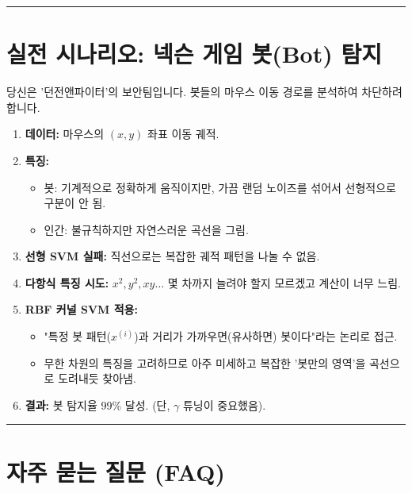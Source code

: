 \documentclass[11pt,a4paper]{book}
\theoremstyle{definition}
\begin{document}
\vspace{0.5cm}\hrule\vspace{0.5cm}

\section{실전 시나리오: 넥슨 게임 봇(Bot) 탐지}

\begin{storybox}[title={Scenario: 인간과 봇의 움직임 구분}]
당신은 '던전앤파이터'의 보안팀입니다. 봇들의 마우스 이동 경로를 분석하여 차단하려 합니다.
\end{storybox}

\begin{enumerate}
    \item \textbf{데이터:} 마우스의 $(x, y)$ 좌표 이동 궤적.
    \item \textbf{특징:}
    \begin{itemize}
        \item 봇: 기계적으로 정확하게 움직이지만, 가끔 랜덤 노이즈를 섞어서 선형적으로 구분이 안 됨.
        \item 인간: 불규칙하지만 자연스러운 곡선을 그림.
    \end{itemize}
    \item \textbf{선형 SVM 실패:} 직선으로는 복잡한 궤적 패턴을 나눌 수 없음.
    \item \textbf{다항식 특징 시도:} $x^2, y^2, xy \dots$ 몇 차까지 늘려야 할지 모르겠고 계산이 너무 느림.
    \item \textbf{RBF 커널 SVM 적용:}
    \begin{itemize}
        \item "특정 봇 패턴($x^{(i)}$)과 거리가 가까우면(유사하면) 봇이다"라는 논리로 접근.
        \item 무한 차원의 특징을 고려하므로 아주 미세하고 복잡한 '봇만의 영역'을 곡선으로 도려내듯 찾아냄.
    \end{itemize}
    \item \textbf{결과:} 봇 탐지율 99\% 달성. (단, $\gamma$ 튜닝이 중요했음).
\end{enumerate}

\vspace{0.5cm}\hrule\vspace{0.5cm}

\section{자주 묻는 질문 (FAQ)}
\end{document}
